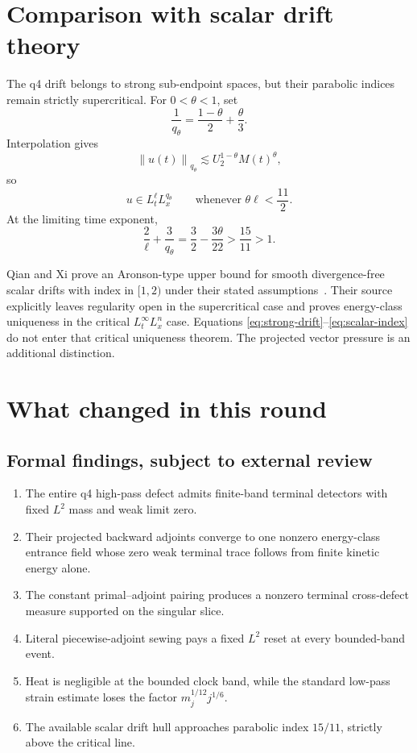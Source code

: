\documentclass[11pt]{article}
\theoremstyle{remark}
\newcommand{\norm}[1]{\left\|#1\right\|}
\begin{document}
\section{Comparison with scalar drift theory}

The q4 drift belongs to strong sub-endpoint spaces, but their parabolic
indices remain strictly supercritical.  For \(0<\theta<1\), set
\[
 \frac1{q_\theta}
 =
 \frac{1-\theta}{2}+\frac{\theta}{3}.
\]
Interpolation gives
\[
 \norm{u(t)}_{q_\theta}
 \lesssim
 U_2^{1-\theta}M(t)^\theta,
\]
so
\begin{equation}
 \label{eq:strong-drift}
 u\in L^\ell_tL^{q_\theta}_x
 \qquad
 \text{whenever }\theta\ell<\frac{11}{2}.
\end{equation}
At the limiting time exponent,
\begin{equation}
 \label{eq:scalar-index}
 \frac2\ell+\frac3{q_\theta}
 =
 \frac32-\frac{3\theta}{22}
 >
 \frac{15}{11}
 >1.
\end{equation}

Qian and Xi prove an Aronson-type upper bound for smooth
divergence-free scalar drifts with index in \([1,2)\)
under their stated assumptions~\cite{QX19}.  Their source explicitly
leaves regularity open in the supercritical case and proves
energy-class uniqueness in the critical \(L^\infty_tL^n_x\) case.
Equations \eqref{eq:strong-drift}--\eqref{eq:scalar-index} do not enter
that critical uniqueness theorem.  The projected vector pressure is an
additional distinction.

\section{What changed in this round}

\subsection*{Formal findings, subject to external review}

\begin{enumerate}
\item The entire q4 high-pass defect admits finite-band terminal
detectors with fixed \(L^2\) mass and weak limit zero.
\item Their projected backward adjoints converge to one nonzero
energy-class entrance field whose zero weak terminal trace follows from
finite kinetic energy alone.
\item The constant primal--adjoint pairing produces a nonzero terminal
cross-defect measure supported on the singular slice.
\item Literal piecewise-adjoint sewing pays a fixed \(L^2\) reset at
every bounded-band event.
\item Heat is negligible at the bounded clock band, while the standard
low-pass strain estimate loses the factor
\(m_j^{1/12}j^{1/6}\).
\item The available scalar drift hull approaches parabolic index
\(15/11\), strictly above the critical line.
\end{enumerate}
\end{document}
